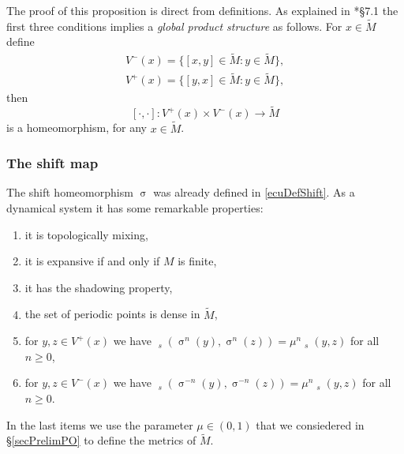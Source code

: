 \documentclass[12pt]{amsart}
\DeclareMathOperator{\shift}{\sigma}
\theoremstyle{plain}
\theoremstyle{definition}
\theoremstyle{remark}
\DeclareMathOperator{\tdist}{\tilde{d}}
\newcommand{\tM}{\tilde{M}}
\begin{document}
The proof of this proposition is direct from definitions.
As explained in \cite{Ruelle}*{\S 7.1} the first three conditions implies a \textit{global product structure} as follows. For $x\in\tM$ define
\begin{align*}
 V^-(x)=\{[x,y]\in \tM :y\in\tM\},\\
 V^+(x)=\{[y,x]\in \tM :y\in\tM\},
\end{align*}
then
\[
[\cdot,\cdot]\colon V^+(x)\times V^-(x)\to \tM
\]
is a homeomorphism, for any $x\in\tM$.

\subsubsection{The shift map}
\label{secPropDynShift}
The shift homeomorphism $\shift$ was already defined in \eqref{ecuDefShift}. As a dynamical system it has some remarkable properties:
\begin{enumerate}
 \item it is topologically mixing,
 \item it is expansive if and only if $M$ is finite,
 \item it has the shadowing property,
 \item the set of periodic points is dense in $\tM$,
 \item for $y,z\in V^+(x)$ we have $\tdist_s(\shift^n(y),\shift^n(z))=\mu^n \tdist_s(y,z)$ for all $n\geq 0$,
 \item for $y,z\in V^-(x)$ we have $\tdist_s(\shift^{-n}(y),\shift^{-n}(z))=\mu^n \tdist_s(y,z)$ for all $n\geq 0$.
\end{enumerate}
In the last items we use the parameter $\mu\in(0,1)$ that we consiedered in \S\ref{secPrelimPO} to define the metrics of $\tM$.
\end{document}
